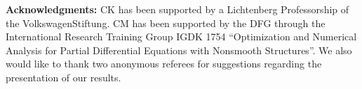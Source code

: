 \documentclass[12pt]{article}
\begin{document}
\textbf{Acknowledgments:} CK has been supported by a Lichtenberg Professorship of the 
VolkswagenStiftung. CM has been supported by the DFG through the International Research 
Training Group IGDK 1754 ``Optimization and Numerical Analysis for Partial Differential 
Equations with Nonsmooth Structures''. We also would like to thank two anonymous referees
for suggestions regarding the presentation of our results.



\end{document}
